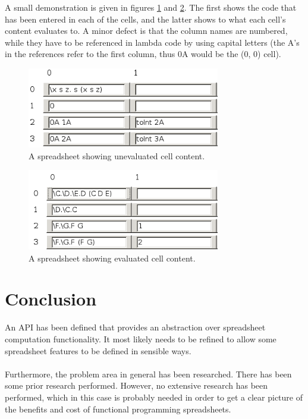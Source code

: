 \documentclass[10pt,a4paper]{article}
\begin{document}
A small demonstration is given in figures \ref{FPContent} and \ref{FPResult}. The first shows the code that has
been entered in each of the cells, and the latter shows to what each cell's content evaluates to.
A minor defect is that the column names are numbered, while they have to be referenced in lambda code
by using capital letters (the A's in the references refer to the first column, thus 0A would be the
(0, 0) cell).
\begin{figure}[H]
  \centering
  \includegraphics[width=0.75\textwidth]{FPContent}
  \caption{A spreadsheet showing unevaluated cell content.}
  \label{FPContent}
\end{figure}
\begin{figure}[H]
  \centering
  \includegraphics[width=0.75\textwidth]{FPResult}
  \caption{A spreadsheet showing evaluated cell content.}
  \label{FPResult}
\end{figure}

\clearpage
\section{Conclusion}
An API has been defined that provides an abstraction over spreadsheet computation functionality.
It most likely needs to be refined to allow some spreadsheet features to be defined in
sensible ways.
\\\\
Furthermore, the problem area in general has been researched. There has been some prior research
performed. However, no extensive research has been performed, which in this case is probably
needed in order to get a clear picture of the benefits and cost of functional programming spreadsheets.
\end{document}
